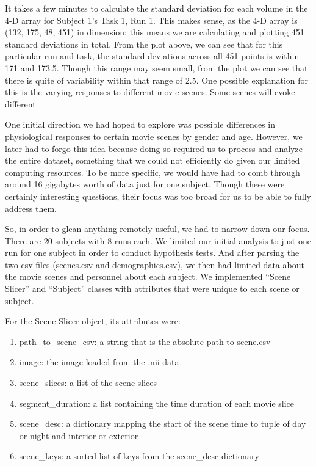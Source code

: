 \documentclass[11pt]{article}
\begin{document}
It takes a few minutes to calculate the standard deviation for each volume in
the 4-D array for Subject 1’s Task 1, Run 1. This makes sense, as the 4-D
array is (132, 175, 48, 451) in dimension; this means we are calculating and
plotting 451 standard deviations in total. From the plot above, we can see
that for this particular run and task, the standard deviations across all 451
points is within 171 and 173.5. Though this range may seem small, from the
plot we can see that there is quite of variability within that range of 2.5.
One possible explanation for this is the varying responses to different movie
scenes. Some scenes will evoke different

One initial direction we had hoped to explore was possible differences in
physiological responses to certain movie scenes by gender and age. However, we
later had to forgo this idea because doing so required us to process and
analyze the entire dataset, something that we could not efficiently do given
our limited computing resources. To be more specific, we would have had to
comb through around 16 gigabytes worth of data just for one subject. Though
these were certainly interesting questions, their focus was too broad for us
to be able to fully address them.

So, in order to glean anything remotely useful, we had to narrow down our
focus. There are 20 subjects with 8 runs each. We limited our initial analysis
to just one run for one subject in order to conduct hypothesis tests. And
after parsing the two csv files (scenes.csv and demographics.csv), we then had
limited data about the movie scenes and personnel about each subject. We
implemented “Scene Slicer” and “Subject” classes with attributes that were
unique to each scene or subject.

For the Scene Slicer object, its attributes were:
\begin{enumerate}
\item path\_to\_scene\_csv: a string that is the absolute path to scene.csv
\item image: the image loaded from the .nii data
\item scene\_slices: a list of the scene slices
\item segment\_duration: a list containing the time duration of each movie
slice
\item scene\_desc: a dictionary mapping the start of the scene time to tuple
of day or night and interior or exterior
\item scene\_keys: a sorted list of keys from the scene\_desc dictionary
\end{enumerate}
\end{document}

